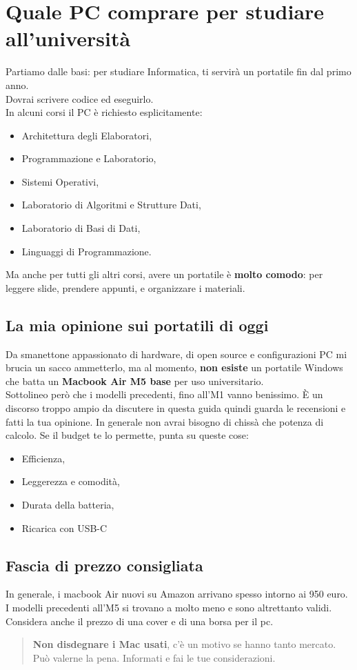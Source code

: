 \documentclass[18pt]{extarticle}
\begin{document}
\section{Quale PC comprare per studiare all’università}
Partiamo dalle basi: per studiare Informatica, ti servirà un portatile fin dal primo anno.\\
Dovrai scrivere codice ed eseguirlo.\\
In alcuni corsi il PC è richiesto esplicitamente:
\begin{itemize}
\item Architettura degli Elaboratori,
\item Programmazione e Laboratorio,
\item Sistemi Operativi,
\item Laboratorio di Algoritmi e Strutture Dati,
\item Laboratorio di Basi di Dati,
\item Linguaggi di Programmazione.
\end{itemize}
Ma anche per tutti gli altri corsi, avere un portatile è \textbf{molto comodo}: per leggere slide, prendere appunti, e organizzare i materiali.


\subsection{La mia opinione sui portatili di oggi}
Da smanettone appassionato di hardware, di open source e configurazioni PC mi brucia un sacco ammetterlo, ma al momento, \textbf{non esiste} un portatile Windows che batta un \textbf{Macbook Air M5 base} per uso universitario.\\ Sottolineo però che i modelli precedenti, fino all'M1 vanno  benissimo. È un discorso troppo ampio da discutere in questa guida quindi guarda le recensioni e fatti la tua opinione. In generale non avrai bisogno di chissà che potenza di calcolo. Se il budget te lo permette, punta su queste cose:

\begin{itemize}
\item Efficienza,
\item Leggerezza e comodità,
\item Durata della batteria,
\item Ricarica con USB-C
\end{itemize}


\subsection{Fascia di prezzo consigliata}
In generale, i macbook Air nuovi su Amazon arrivano spesso intorno ai 950 euro.  
I modelli precedenti all'M5 si trovano a molto meno e sono altrettanto validi.\\
Considera anche il prezzo di una cover e di una borsa per il pc. 
\begin{quote}
\textbf{Non disdegnare i Mac usati}, c'è un motivo se hanno tanto mercato. Può valerne la pena. Informati e fai le tue considerazioni.
\end{quote}
\end{document}
